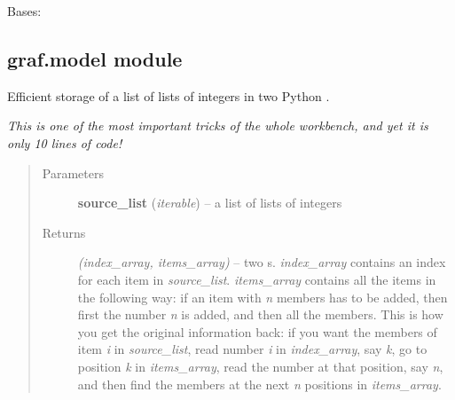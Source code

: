 \documentclass[letterpaper,10pt,english]{sphinxmanual}
\begin{document}

\begin{fulllineitems}
\label{graf/graf:graf.graf.GrafException}
Bases: 

\end{fulllineitems}



\subsection{graf.model module}
\label{graf/graf:graf-model-module}\label{graf/graf:module-graf.model}

\begin{fulllineitems}
\label{graf/graf:graf.model.arrayify}
Efficient storage of a list of lists of integers in two Python \href{http://docs.python.org/library/array.html\#module-array}{}.

\emph{This is one of the most important tricks of the whole workbench, and yet it is only 10 lines of code!}
\begin{quote}\begin{description}
\item[{Parameters}] \leavevmode
\textbf{source\_list} (\emph{iterable}) --
a list of lists of integers

\item[{Returns}] \leavevmode
\emph{(index\_array, items\_array)} --
two \href{http://docs.python.org/library/array.html\#module-array}{} s.
\emph{index\_array} contains an index for each item in \emph{source\_list}.
\emph{items\_array} contains all the items in the following way: if an item with \emph{n} members has to be added,
then first the number \emph{n} is added, and then all the members.
This is how you get the original information back: if you want the
members of item \emph{i} in \emph{source\_list}, read number \emph{i} in \emph{index\_array}, say \emph{k}, go to position \emph{k} in
\emph{items\_array}, read the number at that position, say \emph{n},
and then find the members at the next \emph{n} positions in \emph{items\_array}.

\end{description}\end{quote}

\end{fulllineitems}
\end{document}
